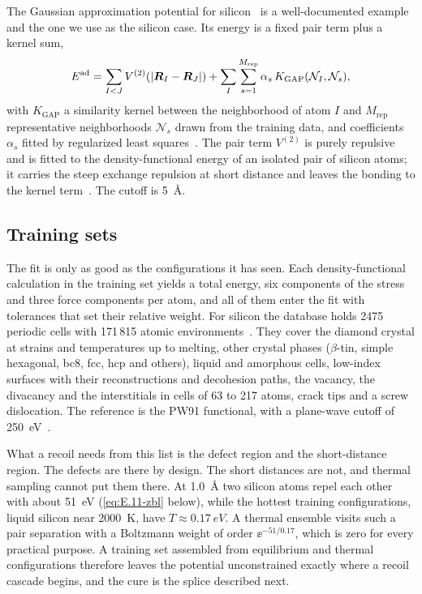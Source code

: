 The Gaussian approximation potential for silicon~\cite{bartok2018machine} is a well-documented example and the one we use as the silicon case. Its energy is a fixed pair term plus a kernel sum,
\begin{equation}
  E^{\mathrm{ad}} = \sum_{I<J}V^{(2)}(|\bm{R}_I - \bm{R}_J|) + \sum_I\sum_{s=1}^{M_{\mathrm{rep}}}\alpha_s\,K_{\mathrm{GAP}}(\mathcal{N}_I, \mathcal{N}_s),
  \label{eq:E.11-gap}
\end{equation}
with $K_{\mathrm{GAP}}$ a similarity kernel between the neighborhood of atom $I$ and $M_{\mathrm{rep}}$ representative neighborhoods $\mathcal{N}_s$ drawn from the training data, and coefficients $\alpha_s$ fitted by regularized least squares~\cite[Eq.~(1)]{bartok2018machine}. The pair term $V^{(2)}$ is purely repulsive and is fitted to the density-functional energy of an isolated pair of silicon atoms; it carries the steep exchange repulsion at short distance and leaves the bonding to the kernel term~\cite[Sect.~II\,A]{bartok2018machine}. The cutoff is \SI{5}{\angstrom}.

\subsection{Training sets}

The fit is only as good as the configurations it has seen. Each density-functional calculation in the training set yields a total energy, six components of the stress and three force components per atom, and all of them enter the fit with tolerances that set their relative weight. For silicon the database holds 2475 periodic cells with 171\,815 atomic environments~\cite[Table~I]{bartok2018machine}. They cover the diamond crystal at strains and temperatures up to melting, other crystal phases ($\beta$-tin, simple hexagonal, bc8, fcc, hcp and others), liquid and amorphous cells, low-index surfaces with their reconstructions and decohesion paths, the vacancy, the divacancy and the interstitials in cells of 63 to 217 atoms, crack tips and a screw dislocation. The reference is the PW91 functional, with a plane-wave cutoff of \SI{250}{eV}~\cite[Sect.~II\,B]{bartok2018machine}.

What a recoil needs from this list is the defect region and the short-distance region. The defects are there by design. The short distances are not, and thermal sampling cannot put them there. At \SI{1.0}{\angstrom} two silicon atoms repel each other with about \SI{51}{eV} (\cref{eq:E.11-zbl} below), while the hottest training configurations, liquid silicon near \SI{2000}{K}, have $T \approx \SI{0.17}{eV}$. A thermal ensemble visits such a pair separation with a Boltzmann weight of order $\ee^{-51/0.17}$, which is zero for every practical purpose. A training set assembled from equilibrium and thermal configurations therefore leaves the potential unconstrained exactly where a recoil cascade begins, and the cure is the splice described next.

